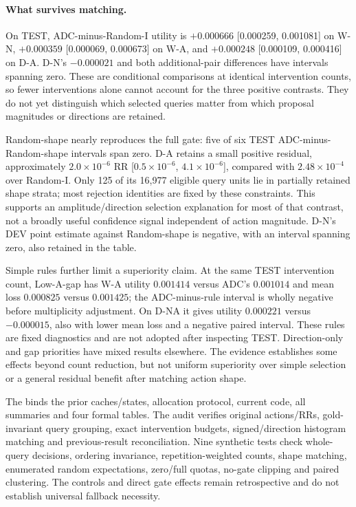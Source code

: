 \documentclass[11pt,a4paper]{article}
\begin{document}



\FloatBarrier

\paragraph{What survives matching.}
On TEST, ADC-minus-Random-I utility is $+0.000666$ [0.000259, 0.001081] on W-N, $+0.000359$ [0.000069, 0.000673] on W-A, and $+0.000248$ [0.000109, 0.000416] on D-A. D-N's $-0.000021$ and both additional-pair differences have intervals spanning zero. These are conditional comparisons at identical intervention counts, so fewer interventions alone cannot account for the three positive contrasts. They do not yet distinguish which selected queries matter from which proposal magnitudes or directions are retained.

Random-shape nearly reproduces the full gate: five of six TEST ADC-minus-Random-shape intervals span zero. D-A retains a small positive residual, approximately $2.0\times10^{-6}$ RR [$0.5\times10^{-6}$, $4.1\times10^{-6}$], compared with $2.48\times10^{-4}$ over Random-I. Only 125 of its 16,977 eligible query units lie in partially retained shape strata; most rejection identities are fixed by these constraints. This supports an amplitude/direction selection explanation for most of that contrast, not a broadly useful confidence signal independent of action magnitude. D-N's DEV point estimate against Random-shape is negative, with an interval spanning zero, also retained in the table.

Simple rules further limit a superiority claim. At the same TEST intervention count, Low-A-gap has W-A utility $0.001414$ versus ADC's $0.001014$ and mean loss $0.000825$ versus $0.001425$; the ADC-minus-rule interval is wholly negative before multiplicity adjustment. On D-NA it gives utility $0.000221$ versus $-0.000015$, also with lower mean loss and a negative paired interval. These rules are fixed diagnostics and are not adopted after inspecting TEST. Direction-only and gap priorities have mixed results elsewhere. The evidence establishes some effects beyond count reduction, but not uniform superiority over simple selection or a general residual benefit after matching action shape.

The  binds the prior caches/states, allocation protocol, current code, all summaries and four formal tables. The audit verifies original actions/RRs, gold-invariant query grouping, exact intervention budgets, signed/direction histogram matching and previous-result reconciliation. Nine synthetic tests check whole-query decisions, ordering invariance, repetition-weighted counts, shape matching, enumerated random expectations, zero/full quotas, no-gate clipping and paired clustering. The controls and direct gate effects remain retrospective and do not establish universal fallback necessity.
\FloatBarrier
\end{document}
